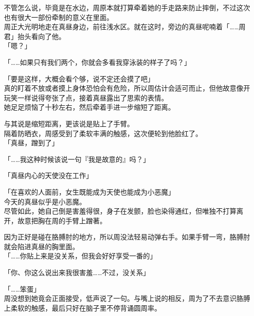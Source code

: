 不管怎么说，毕竟是在水边，周原本就打算牵着她的手走路来防止摔倒，不过这次也有很大一部份牵制的意义在里面。\\

周正大光明地走在真昼身边，前往浅水区。就在这时，旁边的真昼呢喃着「……周君」抬头看向了他。\\

「嗯？」

「……如果只有我们两个，你就会多看我穿泳装的样子了吗？」

「要是这样，大概会看个够，说不定还会摸了吧」\\

真的盯着不放或者摸上身体恐怕会有危险，所以周估计会适可而止，但他故意像开玩笑一样说得夸张了点，接着真昼露出了思索的表情。\\

她足足烦恼了十秒左右，然后牵着手进一步缩短了距离。

与其说是缩短距离，更该说是贴上了手臂。\\

隔着防晒衣，周感受到了柔软丰满的触感，这次便轮到他脸红了。\\

「真昼，蹭到了」

「……我这种时候该说一句『我是故意的』吗？」

「真昼内心的天使没在工作」

「在喜欢的人面前，女生既能成为天使也能成为小恶魔」\\

今天的真昼似乎是小恶魔。\\

尽管如此，她自己倒是害羞得很，身子在发颤，脸也染得通红，但唯独不打算离开，故意把胸在周的手臂上蹭著。

因为正好是碰在胳膊肘的地方，所以周没法轻易动弹右手。如果手臂一弯，胳膊肘就会陷进真昼的胸里面。\\

「……你贴上来是没关系，但我会好好享受一番的」

「你、你这么说出来我很害羞……不过，没关系」

「……笨蛋」\\

周没想到她竟会正面接受，低声说了一句。与嘴上说的相反，周为了不去意识胳膊上柔软的触感，最后只好在脑子里不停背诵圆周率。

